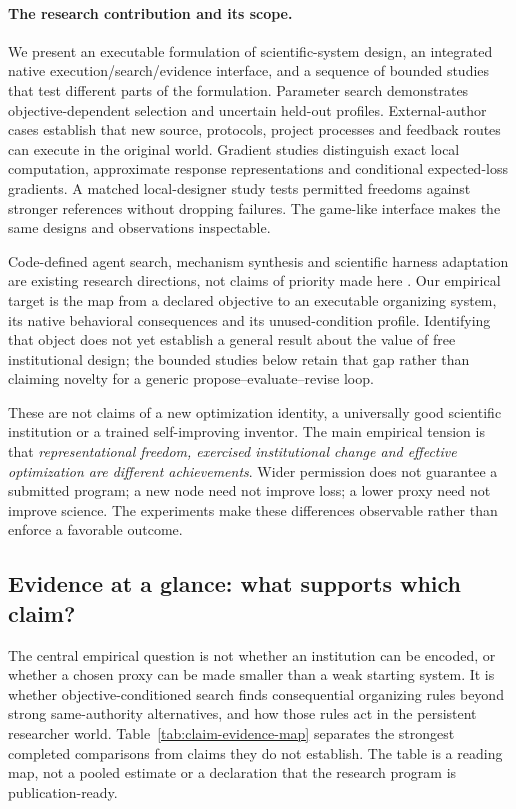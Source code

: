 \paragraph{The research contribution and its scope.}
We present an executable formulation of scientific-system design, an integrated
native execution/search/evidence interface, and a sequence of bounded studies
that test different parts of the formulation. Parameter search demonstrates
objective-dependent selection and uncertain held-out profiles. External-author
cases establish that new source, protocols, project processes and feedback
routes can execute in the original world. Gradient studies distinguish exact
local computation, approximate response representations and conditional
expected-loss gradients. A matched local-designer study tests permitted
freedoms against stronger references without dropping failures. The game-like
interface makes the same designs and observations inspectable.

Code-defined agent search, mechanism synthesis and scientific harness
adaptation are existing research directions, not claims of priority made here
\citep{narayanaswami2022programmatic,hu2024adas,wu2026scimars}.
Our empirical target is the map from a declared objective to an executable
organizing system, its native behavioral consequences and its unused-condition
profile. Identifying that object does not yet establish a general result about
the value of free institutional design; the bounded studies below retain that
gap rather than claiming novelty for a generic propose--evaluate--revise loop.

These are not claims of a new optimization identity, a universally good
scientific institution or a trained self-improving inventor. The main empirical
tension is that \emph{representational freedom, exercised institutional change
and effective optimization are different achievements}. Wider permission
does not guarantee a submitted program; a new node need not improve loss;
a lower proxy need not improve science. The experiments make these differences
observable rather than enforce a favorable outcome.

\subsection*{Evidence at a glance: what supports which claim?}
\label{sec:evidence-at-a-glance}
The central empirical question is not whether an institution can be encoded,
or whether a chosen proxy can be made smaller than a weak starting system.
It is whether objective-conditioned search finds consequential organizing
rules beyond strong same-authority alternatives, and how those rules act in
the persistent researcher world. Table~\ref{tab:claim-evidence-map} separates
the strongest completed comparisons from claims they do not establish.
The table is a reading map, not a pooled estimate or a declaration that the
research program is publication-ready.

